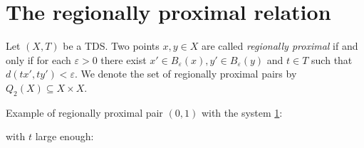 \section{The regionally proximal relation}

\begin{frame}
  \begin{definition}
    \label{def:rpr}
    Let $(X, T)$ be a TDS.
    Two points $x,y \in X$ are called \emph{regionally proximal}
    if and only if for each $\varepsilon > 0$ there exist $x' \in B_\varepsilon(x), y' \in B_\varepsilon(y)$
    and $t \in T$ such that $d(tx', ty') < \varepsilon$.
    We denote the set of regionally proximal pairs by $Q_2(X) \subseteq X \times X$.
  \end{definition}
  
\end{frame}

\begin{frame}
  Example of regionally proximal pair $(0, 1)$ with the system \ref{}:
  
  with $t$ large enough:
  
\end{frame}